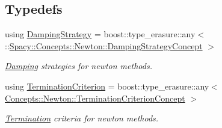 \subsection*{Typedefs}
\begin{DoxyCompactItemize}
\item 
using \hyperlink{namespaceSpacy_1_1Newton_ae2ba8821b209bfac2ab9190e6283cf06_ae2ba8821b209bfac2ab9190e6283cf06}{Damping\+Strategy} = boost\+::type\+\_\+erasure\+::any$<$ \+::\hyperlink{group__NewtonConceptGroup_ga8da917ba6de9c283c1509281956bb04a_ga8da917ba6de9c283c1509281956bb04a}{Spacy\+::\+Concepts\+::\+Newton\+::\+Damping\+Strategy\+Concept} $>$
\begin{DoxyCompactList}\small\item\em \hyperlink{namespaceSpacy_1_1Newton_1_1Damping}{Damping} strategies for newton methods. \end{DoxyCompactList}\item 
using \hyperlink{namespaceSpacy_1_1Newton_abfa64b52531032d7a5fe6d0ec1a3cbd5_abfa64b52531032d7a5fe6d0ec1a3cbd5}{Termination\+Criterion} = boost\+::type\+\_\+erasure\+::any$<$ \hyperlink{group__NewtonConceptGroup_ga7d7604bea8b7c261d3179a7e95ffbe76_ga7d7604bea8b7c261d3179a7e95ffbe76}{Concepts\+::\+Newton\+::\+Termination\+Criterion\+Concept} $>$
\begin{DoxyCompactList}\small\item\em \hyperlink{namespaceSpacy_1_1Newton_1_1Termination}{Termination} criteria for newton methods. \end{DoxyCompactList}\end{DoxyCompactItemize}

